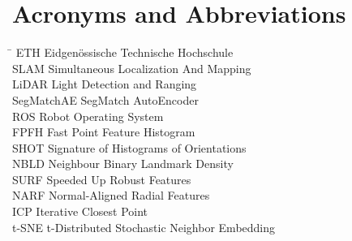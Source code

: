 \section*{Acronyms and Abbreviations}
\begin{tabbing}
 \hspace*{2.6cm}  \= \kill
 ETH \> Eidgenössische Technische Hochschule \\[0.5ex]
 SLAM \> Simultaneous Localization And Mapping \\[0.5ex]
 LiDAR \> Light Detection and Ranging \\[0.5ex]
 SegMatchAE \> SegMatch AutoEncoder \\[0.5ex]
 ROS \> Robot Operating System \\[0.5ex]
 FPFH \> Fast Point Feature Histogram\\[0.5ex]
 SHOT \> Signature of Histograms of Orientations\\[0.5ex]
 NBLD \> Neighbour Binary Landmark Density\\[0.5ex]
 SURF \> Speeded Up Robust Features\\[0.5ex]
 NARF \> Normal-Aligned Radial Features\\[0.5ex]
 ICP \> Iterative Closest Point\\[0.5ex]
 t-SNE \> t-Distributed Stochastic Neighbor Embedding\\[0.5ex]
\end{tabbing}
